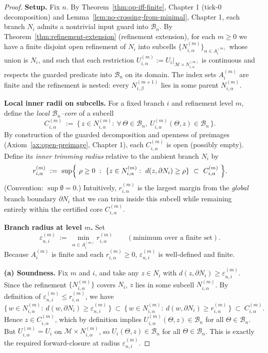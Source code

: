 \documentclass[12pt]{article}
\theoremstyle{definition}
\theoremstyle{plain}
\begin{document}
\begin{proof}
\textbf{Setup.}
Fix $n$. By Theorem~\ref{thm:op-iff-finite}, Chapter 1 (tick-$0$ decomposition) and Lemma~\ref{lem:no-crossing-from-minimal}, Chapter 1, each branch
$N_i$ admits a nontrivial input guard into $\mathcal B_n$. By Theorem~\ref{thm:refinement-extension} (refinement extension),
for each $m\ge0$ we have a finite disjoint open refinement of $N_i$ into subcells
$\{N_{i,\alpha}^{(m)}\}_{\alpha\in A_i^{(m)}}$ whose union is $N_i$, and such that each restriction
$U_{i,\alpha}^{(m)}:=U_i|_{\mathcal M\times N_{i,\alpha}^{(m)}}$ is continuous and respects the guarded predicate into
$\mathcal B_n$ on its domain. The index sets $A_i^{(m)}$ are finite and the refinement is nested:
every $N_{i,\beta}^{(m+1)}$ lies in some parent $N_{i,\alpha}^{(m)}$.

\medskip
\textbf{Local inner radii on subcells.}
For a fixed branch $i$ and refinement level $m$, define the \emph{local $\mathcal B_n$–core} of a subcell
\[
  C_{i,\alpha}^{(m)}
  \ :=\
  \bigl\{\, z\in N_{i,\alpha}^{(m)}:\ \forall\,\Theta\in\mathcal B_n,\ U_{i,\alpha}^{(m)}(\Theta,z)\in\mathcal B_n \,\bigr\}.
\]
By construction of the guarded decomposition and openness of preimages (Axiom~\ref{ax:open-preimage}, Chapter 1), each
$C_{i,\alpha}^{(m)}$ is open (possibly empty). Define its \emph{inner trimming radius} relative to the ambient
branch $N_i$ by
\[
  r_{i,\alpha}^{(m)}
  \ :=\
  \sup \Bigl\{\ \rho\ge0\ :\ \{z\in N_{i,\alpha}^{(m)}:\ d(z,\partial N_i)\ge \rho\}\ \subset\ C_{i,\alpha}^{(m)} \ \Bigr\}.
\]
(Convention: $\sup\emptyset=0$.) Intuitively, $r_{i,\alpha}^{(m)}$ is the largest margin from the \emph{global} branch
boundary $\partial N_i$ that we can trim inside this subcell while remaining entirely within the certified core $C_{i,\alpha}^{(m)}$.

\medskip
\textbf{Branch radius at level $m$.}
Set
\[
  \varepsilon_{n,i}^{(m)} \ :=\ \min_{\alpha\in A_i^{(m)}} r_{i,\alpha}^{(m)} \qquad(\text{minimum over a finite set}).
\]
Because $A_i^{(m)}$ is finite and each $r_{i,\alpha}^{(m)}\ge0$, $\varepsilon_{n,i}^{(m)}$ is well-defined and finite.

\medskip
\textbf{(a) Soundness.}
Fix $m$ and $i$, and take any $z\in N_i$ with $d(z,\partial N_i)\ge \varepsilon_{n,i}^{(m)}$. Since the refinement
$\{N_{i,\alpha}^{(m)}\}$ covers $N_i$, $z$ lies in some subcell $N_{i,\alpha}^{(m)}$. By definition of
$\varepsilon_{n,i}^{(m)}\le r_{i,\alpha}^{(m)}$, we have
\[
  \{\, w\in N_{i,\alpha}^{(m)}:\ d(w,\partial N_i)\ge \varepsilon_{n,i}^{(m)}\,\}
  \ \subset\ 
  \{\, w\in N_{i,\alpha}^{(m)}:\ d(w,\partial N_i)\ge r_{i,\alpha}^{(m)}\,\}
  \ \subset\ C_{i,\alpha}^{(m)}.
\]
Hence $z\in C_{i,\alpha}^{(m)}$, which by definition implies
$U_{i,\alpha}^{(m)}(\Theta,z)\in\mathcal B_n$ for all $\Theta\in\mathcal B_n$. But
$U_{i,\alpha}^{(m)}=U_i$ on $\mathcal M\times N_{i,\alpha}^{(m)}$, so $U_i(\Theta,z)\in\mathcal B_n$ for all
$\Theta\in\mathcal B_n$. This is exactly the required forward-closure at radius $\varepsilon_{n,i}^{(m)}$.


\end{proof}
\end{document}
